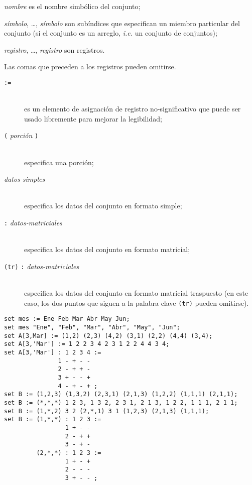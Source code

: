 \documentclass[11pt,spanish]{report}
\def\para#1{\noindent{\bf#1}}
\begin{document}
\medskip

\noindent
{\it nombre} es el nombre simbólico del conjunto;

\noindent
{\it símbolo}, \dots, {\it símbolo} son subíndices que especifican un miembro particular del conjunto (si el conjunto es un arreglo, {\it i.e.} un conjunto de conjuntos);

\noindent
{\it registro}, \dots, {\it registro} son registros.

\noindent
Las comas que preceden a los registros pueden omitirse.

\para{Registros}

\vspace*{-8pt}

\begin{description}
\item[{\tt :=}]\hspace*{0pt}\\
es un elemento de asignación de registro no-significativo que puede ser usado libremente para mejorar la legibilidad;
\item[{\tt(} {\it porción} {\tt)}]\hspace*{0pt}\\
especifica una porción;
\item[{\it datos-simples}]\hspace*{0pt}\\
especifica los datos del conjunto en formato simple;
\item[{\tt:} {\it datos-matriciales}]\hspace*{0pt}\\
especifica los datos del conjunto en formato matricial;
\item[{\tt(tr)} {\tt:} {\it datos-matriciales}]\hspace*{0pt}\\
especifica los datos del conjunto en formato matricial traspuesto (en este caso, los dos puntos que siguen a la palabra clave {\tt(tr)} pueden omitirse).
\end{description}

\vspace*{-8pt}

\para{Ejemplos}

\begin{verbatim}
set mes := Ene Feb Mar Abr May Jun;
set mes "Ene", "Feb", "Mar", "Abr", "May", "Jun";
set A[3,Mar] := (1,2) (2,3) (4,2) (3,1) (2,2) (4,4) (3,4);
set A[3,'Mar'] := 1 2 2 3 4 2 3 1 2 2 4 4 3 4;
set A[3,'Mar'] : 1 2 3 4 :=
               1 - + - -
               2 - + + -
               3 + - - +
               4 - + - + ;
set B := (1,2,3) (1,3,2) (2,3,1) (2,1,3) (1,2,2) (1,1,1) (2,1,1);
set B := (*,*,*) 1 2 3, 1 3 2, 2 3 1, 2 1 3, 1 2 2, 1 1 1, 2 1 1;
set B := (1,*,2) 3 2 (2,*,1) 3 1 (1,2,3) (2,1,3) (1,1,1);
set B := (1,*,*) : 1 2 3 :=
                 1 + - -
                 2 - + +
                 3 - + -
         (2,*,*) : 1 2 3 :=
                 1 + - +
                 2 - - -
                 3 + - - ;
\end{verbatim}
\end{document}
